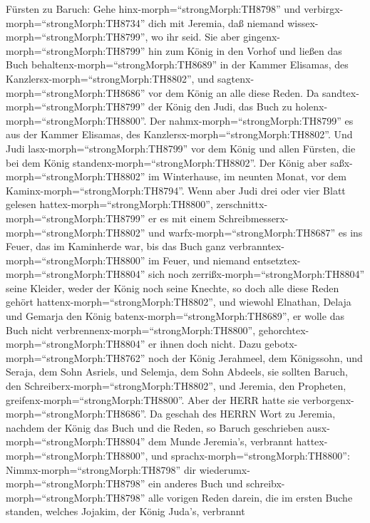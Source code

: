 Fürsten zu Baruch: Gehe hinx-morph=``strongMorph:TH8798'' und
verbirgx-morph=``strongMorph:TH8734'' dich mit Jeremia, daß niemand
wissex-morph=``strongMorph:TH8799'', wo ihr seid.  Sie aber
gingenx-morph=``strongMorph:TH8799'' hin zum König in den Vorhof und
ließen das Buch behaltenx-morph=``strongMorph:TH8689'' in der Kammer
Elisamas, des Kanzlersx-morph=``strongMorph:TH8802'', und
sagtenx-morph=``strongMorph:TH8686'' vor dem König an alle diese Reden.
 Da sandtex-morph=``strongMorph:TH8799'' der König den
Judi, das Buch zu holenx-morph=``strongMorph:TH8800''. Der
nahmx-morph=``strongMorph:TH8799'' es aus der Kammer Elisamas, des
Kanzlersx-morph=``strongMorph:TH8802''. Und Judi
lasx-morph=``strongMorph:TH8799'' vor dem König und allen Fürsten, die
bei dem König standenx-morph=``strongMorph:TH8802''.  Der
König aber saßx-morph=``strongMorph:TH8802'' im Winterhause, im neunten
Monat, vor dem Kaminx-morph=``strongMorph:TH8794''.  Wenn
aber Judi drei oder vier Blatt gelesen
hattex-morph=``strongMorph:TH8800'',
zerschnittx-morph=``strongMorph:TH8799'' er es mit einem
Schreibmesserx-morph=``strongMorph:TH8802'' und
warfx-morph=``strongMorph:TH8687'' es ins Feuer, das im Kaminherde war,
bis das Buch ganz verbranntex-morph=``strongMorph:TH8800'' im Feuer,
 und niemand entsetztex-morph=``strongMorph:TH8804'' sich
noch zerrißx-morph=``strongMorph:TH8804'' seine Kleider, weder der König
noch seine Knechte, so doch alle diese Reden gehört
hattenx-morph=``strongMorph:TH8802'',  und wiewohl
Elnathan, Delaja und Gemarja den König
batenx-morph=``strongMorph:TH8689'', er wolle das Buch nicht
verbrennenx-morph=``strongMorph:TH8800'',
gehorchtex-morph=``strongMorph:TH8804'' er ihnen doch nicht.
 Dazu gebotx-morph=``strongMorph:TH8762'' noch der König
Jerahmeel, dem Königssohn, und Seraja, dem Sohn Asriels, und Selemja,
dem Sohn Abdeels, sie sollten Baruch, den
Schreiberx-morph=``strongMorph:TH8802'', und Jeremia, den Propheten,
greifenx-morph=``strongMorph:TH8800''. Aber der HERR hatte sie
verborgenx-morph=``strongMorph:TH8686''.  Da geschah des
HERRN Wort zu Jeremia, nachdem der König das Buch und die Reden, so
Baruch geschrieben ausx-morph=``strongMorph:TH8804'' dem Munde
Jeremia's, verbrannt hattex-morph=``strongMorph:TH8800'', und
sprachx-morph=``strongMorph:TH8800'': 
Nimmx-morph=``strongMorph:TH8798'' dir
wiederumx-morph=``strongMorph:TH8798'' ein anderes Buch und
schreibx-morph=``strongMorph:TH8798'' alle vorigen Reden darein, die im
ersten Buche standen, welches Jojakim, der König Juda's, verbrannt
